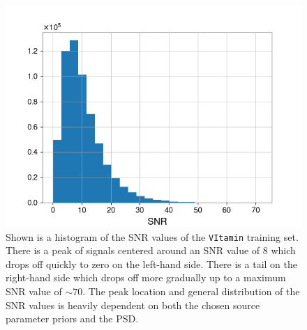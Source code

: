 \begin{figure}
    \includegraphics[width=\columnwidth]{figures/TrainingSetSNR_distribution.png}
    \caption[VItamin SNR training set distribution.]{\label{fig:VItamin_TrainingSet_SNR_Dist} Shown is a histogram of the \ac{SNR} values of the \texttt{VItamin} training set. There is a peak of signals centered around an \ac{SNR} value of 8 which drops off quickly to zero on the left-hand side. There is a tail on the right-hand side which drops off more gradually up to a maximum \ac{SNR} value of $\sim 70$. The peak location and general distribution of the \ac{SNR} values is heavily dependent on both the chosen source parameter priors and the \ac{PSD}.}
\end{figure}

